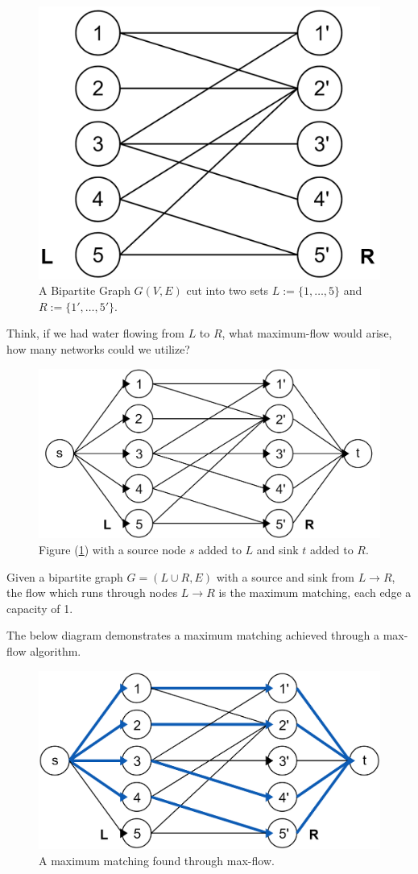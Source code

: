 \vspace{-.5em}
\begin{figure}[h]
    \centering
    \includegraphics[width=.35\textwidth]{Sections/net/bip.png}
    \caption{A Bipartite Graph $G(V,E)$ cut into two sets $L:=\{1,\dots,5\}$ and $R:=\{1',\dots,5'\}$.}
    \label{fig:bip}
\end{figure}

\noindent
Think, if we had water flowing from $L$ to $R$, what maximum-flow would arise, how many networks could we utilize?

\begin{figure}[h]
    \centering
    \includegraphics[width=.5\textwidth]{Sections/net/bipflow.png}
    \caption{Figure (\ref{fig:bip}) with a source node $s$ added to $L$ and sink $t$ added to $R$.}
\end{figure}

\noindent
\begin{theo}

    Given a bipartite graph $G=(L\cup R,E)$ with a source and sink from $L\to R$, the flow which runs through nodes $L\to R$ is the maximum matching, each edge a capacity of 1.  
\end{theo}

\newpage 
\noindent

The below diagram demonstrates a maximum matching achieved through a max-flow algorithm.

\begin{figure}[h]
    \centering
    \includegraphics[width=.45\textwidth]{Sections/net/bipmax.png}
    \caption{A maximum matching found through max-flow.}
\end{figure}

